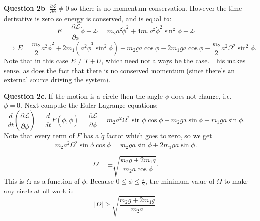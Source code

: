 \documentclass[letterpaper, reqno,11pt]{article}
\begin{document}
{\noindent\bf Question 2b.} $\frac{\partial\mathcal L}{\partial \phi}\neq 0$ so there is no momentum conservation. However the time derivative is zero so energy is conserved, and is equal to: 
\[
E=\frac{\partial\mathcal L}{\partial \dot \phi}\dot\phi-\mathcal L=m_2a^2\dot\phi^2+4m_1a^2\dot\phi^2\sin^2\phi-\mathcal L
\]
\[
\implies E=\frac{m_2}{2}a^2\dot\phi^2+2m_1\left( a^2\dot\phi^2\sin^2\phi \right)-m_2ga\cos\phi-2m_1ga\cos\phi-\frac{m_2}{2}a^2\Omega^2\sin^2\phi
.\]
Note that in this case $E\neq T+U$, which need not always be the case. This makes sense, as does the fact that there is no conserved momentum (since there's an external source driving the system). 

{\noindent\bf Question 2c.} If the motion is a circle then the angle $\phi$ does not change, i.e. $\dot\phi=0$. Next compute the Euler Lagrange equations: 
\[
\frac{d}{dt}\left( \frac{\partial \mathcal L}{\partial \dot\phi} \right)=\frac{d}{dt}F(\phi, \dot\phi)=\frac{\partial\mathcal L}{\partial \phi}=m_2a^2\Omega^2\sin\phi\cos\phi-m_2ga\sin\phi-m_1ga\sin\phi
.\]
Note that every term of $F$ has a $\dot q$ factor which goes to zero, so we get
 \[
m_2a^2\Omega^2\sin\phi\cos\phi=m_2ga\sin\phi+2m_1ga\sin\phi
.\]

\[
\Omega=\pm\sqrt{\frac{m_2g+2m_1g}{m_2a\cos\phi}} 
.\]
This is $\Omega$ as a function of $\phi$. Because $0\leq\phi\leq\frac{\pi}{2}$, the minimum value of $\Omega$ to make any circle at all work is 
\[
|\Omega|\geq\sqrt{\frac{m_2g+2m_1g}{m_2a}}
.\]
\end{document}
